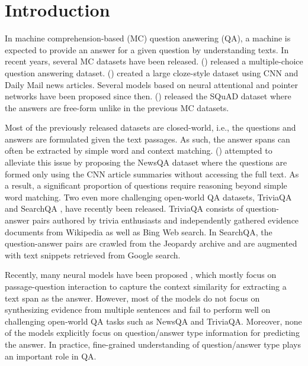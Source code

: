 \documentclass[letterpaper]{article} %
\begin{document}
\section{Introduction}
\label{sec:intro}
In machine comprehension-based (MC) question answering (QA), a machine is expected to provide an answer for a given question by understanding texts. 
In recent years, several MC datasets have been released. 
\citeauthor{MCTestdata} (\citeyear{MCTestdata}) released a multiple-choice question answering dataset.
\citeauthor{HermannKGEKSB15} (\citeyear{HermannKGEKSB15}) created a large cloze-style dataset using CNN and Daily Mail news articles. Several models \cite{HermannKGEKSB15,chen2016thorough,KadlecSBK16,Kobayashi2016,attn_over_attn,GAR} based on neural attentional and pointer networks \cite{pointer_net} have been proposed since then. 
\citeauthor{RajpurkarZLL16} (\citeyear{RajpurkarZLL16}) released the SQuAD dataset where the answers are free-form unlike in the previous MC datasets.

Most of the previously released datasets are closed-world, i.e., the questions and answers are formulated given the text passages. As such, the answer spans can often be extracted by simple word and context matching. \citeauthor{newsqa} (\citeyear{newsqa}) attempted to alleviate this issue by proposing the NewsQA dataset where the questions are formed only using the CNN article summaries without accessing the full text. As a result, a significant proportion of questions require reasoning beyond simple word matching. 
Two even more challenging open-world QA datasets, TriviaQA \cite{triviaqa} and SearchQA \cite{searchqa}, have recently been released. 
TriviaQA consists of question-answer pairs authored by trivia enthusiasts and independently gathered evidence documents from Wikipedia as well as Bing Web search. 
In SearchQA, the question-answer pairs are crawled from the Jeopardy archive and are augmented with text snippets retrieved from Google search.

Recently, many neural models have been proposed \cite{mpcm_squad,memen,allenai_squad,smu_squad,fastqa_squad,salesforce_squad,cmu_squad}, which mostly focus on passage-question interaction to capture the context similarity for extracting a text span as the answer. 
However, most of the models do not focus on synthesizing evidence from multiple sentences and fail to perform well on challenging open-world QA tasks such as NewsQA and TriviaQA. 
Moreover, none of the models explicitly focus on question/answer type information for predicting the answer. In practice, fine-grained understanding of question/answer type plays an important role in QA. 
\end{document}
